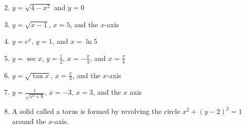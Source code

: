 \documentclass[12pt]{article}
\newif\ifans
\begin{document}

\begin{enumerate}
\setcounter{enumi}{1}

\item $y=\sqrt{4-x^2}$ and $y=0$

\ifans{\fbox{$\frac{32\pi}{3}$}} \fi

\item $y=\sqrt{x-1}$, $x=5$, and the $x$-axis

\ifans{\fbox{$8\pi$}} \fi

\item $y=e^x$, $y=1$, and $x=\ln{5}$

\ifans{\fbox{$\pi(12-\ln{5})$}} \fi

\item $y=\sec{x}$, $y=\frac{1}{2}$, $x=-\frac{\pi}{4}$, and $x=\frac{\pi}{4}$

\ifans{\fbox{$2\pi-\frac{\pi^2}{8}$}} \fi

\item $y=\sqrt{\tan{x}}$, $x=\frac{\pi}{3}$, and the $x$-axis

\ifans{\fbox{$\pi\ln{2}$}} \fi

\item $y=\frac{1}{\sqrt{x^2+9}}$, $x=-3$, $x=3$, and the $x$ axis

\ifans{\fbox{$\frac{\pi^2}{6}$}} \fi

\item A solid called a torus is formed by revolving the circle $x^2+(y-2)^2=1$ around the $x$-axis. 


\end{enumerate}
\end{document}
